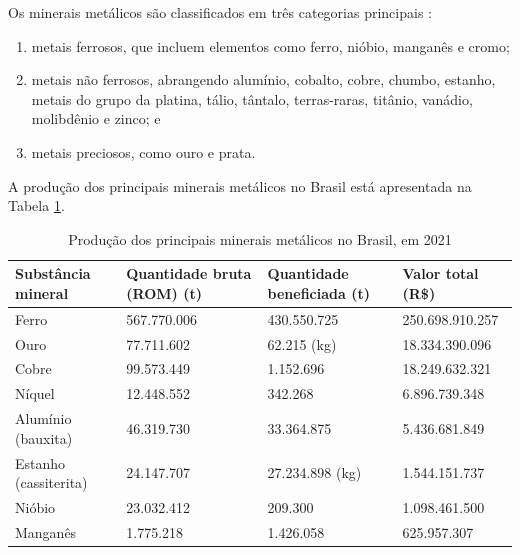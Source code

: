 Os minerais metálicos são classificados em três categorias principais \cite{carvalho2018sustentabilidade}:

\begin{enumerate}
    \item metais ferrosos, que incluem elementos como ferro, nióbio, manganês e cromo;
    
    \item metais não ferrosos, abrangendo alumínio, cobalto, cobre, chumbo, estanho, metais do grupo da platina, tálio, tântalo, terras-raras, titânio, vanádio, molibdênio e zinco; e
    
    \item metais preciosos, como ouro e prata.
\end{enumerate}

A produção dos principais minerais metálicos no Brasil está apresentada na Tabela \ref{tab:producao-minerais}.

\begin{table}[!htb]
    \centering
    \ABNTEXfontereduzida
    \captionsetup{justification=centering}
    \caption{Produção dos principais minerais metálicos no Brasil, em 2021}
    \label{tab:producao-minerais}
    \begin{tabular}{|p{4cm}|p{3cm}|p{3cm}|p{3cm}|}
        \hline
        \textbf{Substância mineral} & \textbf{Quantidade bruta (ROM) (t)} & \textbf{Quantidade beneficiada (t)} & \textbf{Valor total (R\$)} \\
        \hline
        Ferro & 567.770.006 & 430.550.725 & 250.698.910.257 \\
        Ouro & 77.711.602 & 62.215 (kg) & 18.334.390.096 \\
        Cobre & 99.573.449 & 1.152.696 & 18.249.632.321 \\
        Níquel & 12.448.552 & 342.268 & 6.896.739.348 \\
        Alumínio (bauxita) & 46.319.730 & 33.364.875 & 5.436.681.849 \\
        Estanho (cassiterita) & 24.147.707 & 27.234.898 (kg) & 1.544.151.737 \\
        Nióbio & 23.032.412 & 209.300 & 1.098.461.500 \\
        Manganês & 1.775.218 & 1.426.058 & 625.957.307 \\
        \hline
    \end{tabular}
\end{table}

